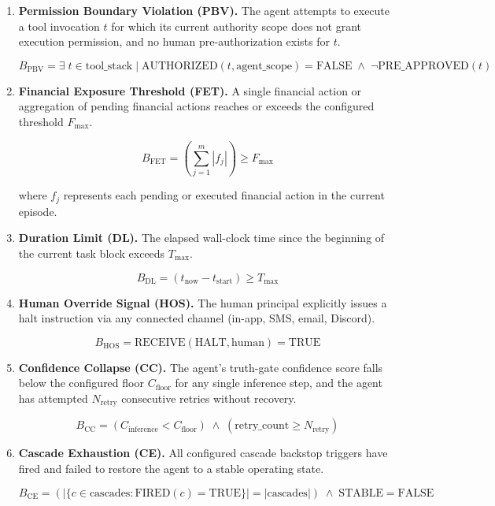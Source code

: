 \begin{enumerate}
  \item \textbf{Permission Boundary Violation (PBV).} The agent attempts to execute a tool invocation $t$ for which its current authority scope does not grant execution permission, and no human pre-authorization exists for $t$.

  \[
  B_{\text{PBV}} = \exists \; t \in \text{tool\_stack} \;|\; \text{AUTHORIZED}(t, \text{agent\_scope}) = \text{FALSE} \;\land\; \neg\text{PRE\_APPROVED}(t)
  \]

  \item \textbf{Financial Exposure Threshold (FET).} A single financial action or aggregation of pending financial actions reaches or exceeds the configured threshold $F_{\text{max}}$.

  \[
  B_{\text{FET}} = \left( \sum_{j=1}^{m} |f_j| \right) \geq F_{\text{max}}
  \]

  where $f_j$ represents each pending or executed financial action in the current episode.

  \item \textbf{Duration Limit (DL).} The elapsed wall-clock time since the beginning of the current task block exceeds $T_{\text{max}}$.

  \[
  B_{\text{DL}} = \left( t_{\text{now}} - t_{\text{start}} \right) \geq T_{\text{max}}
  \]

  \item \textbf{Human Override Signal (HOS).} The human principal explicitly issues a halt instruction via any connected channel (in-app, SMS, email, Discord).

  \[
  B_{\text{HOS}} = \text{RECEIVE}(\text{HALT}, \text{human}) = \text{TRUE}
  \]

  \item \textbf{Confidence Collapse (CC).} The agent's truth-gate confidence score falls below the configured floor $C_{\text{floor}}$ for any single inference step, and the agent has attempted $N_{\text{retry}}$ consecutive retries without recovery.

  \[
  B_{\text{CC}} = \left( C_{\text{inference}} < C_{\text{floor}} \right) \;\land\; \left( \text{retry\_count} \geq N_{\text{retry}} \right)
  \]

  \item \textbf{Cascade Exhaustion (CE).} All configured cascade backstop triggers have fired and failed to restore the agent to a stable operating state.

  \[
  B_{\text{CE}} = \left( |\{c \in \text{cascades} : \text{FIRED}(c) = \text{TRUE}\}| = |\text{cascades}| \right) \;\land\; \text{STABLE} = \text{FALSE}
  \]
\end{enumerate}

